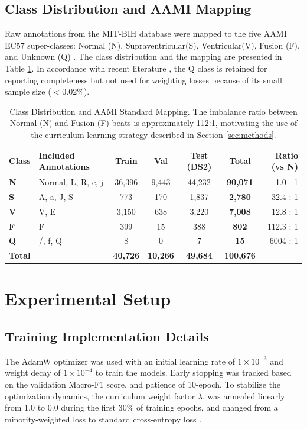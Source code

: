 \documentclass[pdflatex,sn-mathphys-num]{sn-jnl}
\theoremstyle{thmstyleone}
\theoremstyle{thmstyletwo}
\theoremstyle{thmstylethree}
\begin{document}
\subsection{Class Distribution and AAMI Mapping}
Raw annotations from the MIT-BIH database were mapped to the five AAMI EC57 super-classes: Normal (N), Supraventricular(S), Ventricular(V), Fusion (F), and Unknown (Q) \cite{xiao_deep_2023, luz_survey_2016}. The class distribution and the mapping are presented in Table \ref{tab:class_dist}. In accordance with recent literature \cite{farag_tiny_2023}, the Q class is retained for reporting completeness but not used for weighting losses because of its small sample size ($< 0.02\%$).

\begin{table}[ht]
\caption{Class Distribution and AAMI Standard Mapping. The imbalance ratio between Normal (N) and Fusion (F) beats is approximately 112:1, motivating the use of the curriculum learning strategy described in Section \ref{sec:methods}.}
\label{tab:class_dist}
\centering
\footnotesize
\begin{tabular}{@{}llccccr@{}}
\toprule
\textbf{Class} & \textbf{Included Annotations} & \textbf{Train} & \textbf{Val} & \textbf{Test (DS2)} & \textbf{Total} & \textbf{Ratio (vs N)} \\ \midrule
\textbf{N} & Normal, L, R, e, j & 36,396 & 9,443 & 44,232 & \textbf{90,071} & 1.0 : 1 \\
\textbf{S} & A, a, J, S & 773 & 170 & 1,837 & \textbf{2,780} & 32.4 : 1 \\
\textbf{V} & V, E & 3,150 & 638 & 3,220 & \textbf{7,008} & 12.8 : 1 \\
\textbf{F} & F & 399 & 15 & 388 & \textbf{802} & 112.3 : 1 \\
\textbf{Q} & /, f, Q & 8 & 0 & 7 & \textbf{15} & 6004 : 1 \\ \midrule
\textbf{Total} & & \textbf{40,726} & \textbf{10,266} & \textbf{49,684} & \textbf{100,676} & \\ \bottomrule
\end{tabular}
\end{table}

\section{Experimental Setup}

\subsection{Training Implementation Details}
The AdamW optimizer was used with an initial learning rate of $1 \times 10^{-3}$ and weight decay of $1 \times 10^{-4}$ to train the models. Early stopping was tracked based on the validation Macro-F1 score, and patience of 10-epoch. To stabilize the optimization dynamics, the curriculum weight factor $\lambda$, was annealed linearly from 1.0 to 0.0 during the first 30\% of training epochs, and changed from a minority-weighted loss to standard cross-entropy loss \cite{schmale_curriculum_2025}.
\end{document}
